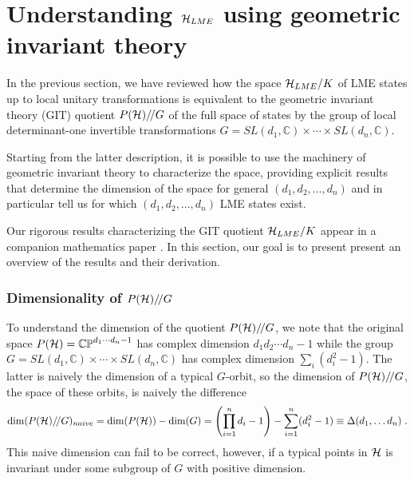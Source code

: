 \documentclass[12pt]{article}
\theoremstyle{definition}
\newcommand{\be}{\begin{equation}}
\newcommand{\ee}{\end{equation}}
\newcommand{\GITquot}{/\!/}
\begin{document}
\section{Understanding ${\cal H}_{LME}$ using geometric invariant theory}

In the previous section, we have reviewed how the space ${\cal H}_{LME}/K$ of LME states up to local unitary transformations is equivalent to the geometric invariant theory (GIT) quotient $P({\cal H})\GITquot G$ of the full space of states by the group of local determinant-one invertible transformations $G = SL(d_1,\mathbb{C}) \times \cdots \times SL(d_n,\mathbb{C})$. 

Starting from the latter description, it is possible to use the machinery of geometric invariant theory to characterize the space, providing explicit results that determine the dimension of the space for general $(d_1, d_2, \dots, d_n)$ and in particular tell us for which $(d_1, d_2, \dots, d_n)$ LME states exist. 

Our rigorous results characterizing the GIT quotient ${\cal H}_{LME}/K$ appear in a companion mathematics paper \cite{mathpaper}. In this section, our goal is to present present an overview of the results and their derivation.

\subsubsection*{Dimensionality of $P({\cal H})\GITquot G$}

To understand the dimension of the quotient $P({\cal H})\GITquot G$, we note that the original space $P({\cal H}) = \mathbb{CP}^{d_1 \cdots d_n -1}$ has complex dimension $d_1 d_2 \cdots d_n - 1$ while the group $G = SL(d_1, \mathbb{C}) \times \cdots \times SL(d_n, \mathbb{C})$ has complex dimension $\sum_i (d_i^2 -1)$. The latter is naively the dimension of a typical $G$-orbit, so the dimension of $P({\cal H})\GITquot G$, the space of these orbits, is naively the difference
\be
\label{defDel1}
{\rm dim}(P({\cal H})\GITquot G)_{naive} = {\rm dim}(P({\cal H})) - {\rm dim}(G) = \left(\prod_{i=1}^n d_i - 1 \right) - \sum_{i=1}^n( d_i^2 -1) \equiv \Delta(d_1, \dots d_n)\; .
\ee
This naive dimension can fail to be correct, however, if a typical points in ${\cal H}$ is invariant under some subgroup of $G$ with positive dimension.
\end{document}
